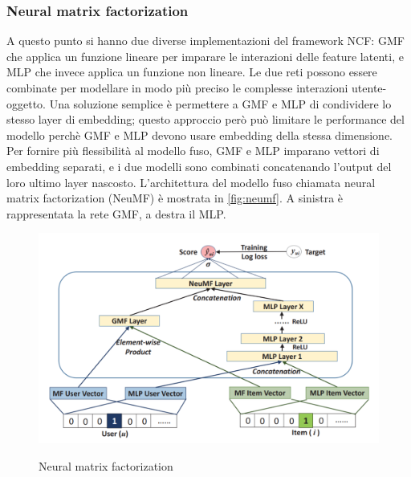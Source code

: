 \documentclass[12pt,italian]{report}
\begin{document}
\subsubsection{Neural matrix factorization} \label{sssec:neumf}
A questo punto si hanno due diverse implementazioni del framework NCF: GMF che applica un funzione lineare per imparare le interazioni delle feature latenti, e MLP che invece applica un funzione non lineare. Le due reti possono essere combinate per modellare in modo più preciso le complesse interazioni utente-oggetto. Una soluzione semplice è permettere a GMF e MLP di condividere lo stesso layer di embedding; questo approccio però può limitare le performance del modello perchè GMF e MLP devono usare embedding della stessa dimensione. Per fornire più flessibilità al modello fuso, GMF e MLP imparano vettori di embedding separati, e i due modelli sono combinati concatenando l'output del loro ultimo layer nascosto. L'architettura del modello fuso chiamata neural matrix factorization (NeuMF) è mostrata in \autoref{fig:neumf}. A sinistra è rappresentata la rete GMF, a destra il MLP.

\begin{figure}
  \centering
  \includegraphics[width=\linewidth]{immagini/neumf.png}
  \caption{Neural matrix factorization}
  \cite{NCF}
  \label{fig:neumf}
\end{figure}
\end{document}
